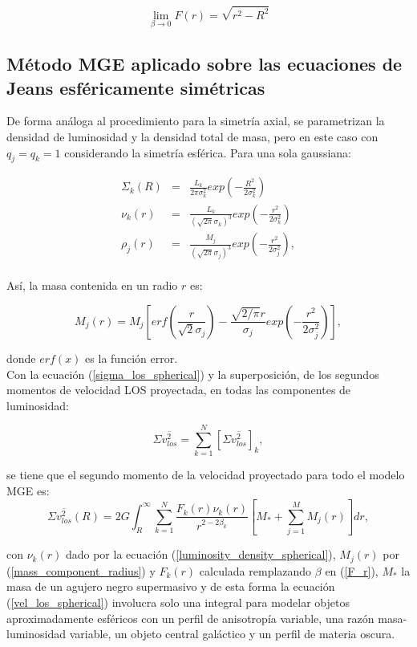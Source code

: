 $$ \lim_{\beta\to 0} F(r) = \sqrt{r^2 - R^2} $$

\subsection{Método MGE aplicado sobre las ecuaciones de Jeans esféricamente simétricas}

De forma análoga al procedimiento para la simetría axial, se parametrizan la densidad de luminosidad y la densidad total de masa, pero en este caso con $q_j = q_k = 1$ considerando la simetría esférica.
Para una sola gaussiana:

\begin{eqnarray}
\Sigma_k (R) &=& \frac{ L_k }{ 2\pi \sigma_k^2 } exp \left( -\frac{R^2}{2\sigma_k^2} \right)\\
\label{luminosity_density_spherical}
\nu_k (r) &=& \frac{ L_k }{ (\sqrt{2\pi} \sigma_k)^3 } exp \left( -\frac{r^2}{2\sigma_k^2} \right)\\
\rho_j (r) &=& \frac{ M_j }{ (\sqrt{2\pi} \sigma_j)^3 } exp \left( -\frac{r^2}{2\sigma_j^2} \right),\\
\end{eqnarray}

Así, la masa contenida en un radio $r$ es:

\begin{equation}
\label{mass_component_radius}
M_j (r) = M_j \left[ erf \left( \frac{r}{\sqrt{2}\sigma_j } \right) -\frac{ \sqrt{2/\pi} r }{\sigma_j } exp \left( -\frac{r^2}{2\sigma_j^2} \right)   \right],
\end{equation}

donde $erf (x)$ es la función error. \\

Con la ecuación (\ref{sigma_los_spherical}) y la superposición, de los segundos momentos de velocidad LOS proyectada, en todas las componentes de luminosidad:

$$ \Sigma \overline{v_{los}^2} = \sum_{k=1}^N \left[ \Sigma \overline{v_{los}^2} \right]_k, $$

se tiene que el segundo momento de la velocidad proyectado para todo el modelo MGE es:
\begin{equation}
\label{vel_los_spherical}
\Sigma \overline{v_{los}^2} (R) = 2G \int_R^{\infty} \sum_{k=1}^N \frac{F_k(r) \nu_k(r) }{ r^{2-2\beta_k} }  \left[ M_* + \sum_{j=1}^M M_j(r) \right] dr,
\end{equation}

con $\nu_k (r)$ dado por la ecuación (\ref{luminosity_density_spherical}), $M_j(r)$ por (\ref{mass_component_radius}) y $F_k(r)$ calculada remplazando $\beta$ en (\ref{F_r}), $M_*$ la masa de un agujero negro supermasivo y de esta forma la ecuación (\ref{vel_los_spherical}) involucra solo una integral para modelar objetos aproximadamente esféricos con un perfil de anisotropía variable, una razón masa-luminosidad variable, un objeto central galáctico y un perfil de materia oscura.




